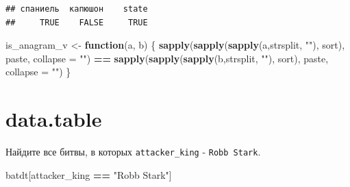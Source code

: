 \documentclass[]{book}
\newenvironment{Shaded}{\begin{snugshade}}{\end{snugshade}}
\newcommand{\KeywordTok}[1]{\textcolor[rgb]{0.13,0.29,0.53}{\textbf{#1}}}
\newcommand{\DataTypeTok}[1]{\textcolor[rgb]{0.13,0.29,0.53}{#1}}
\newcommand{\StringTok}[1]{\textcolor[rgb]{0.31,0.60,0.02}{#1}}
\newcommand{\ControlFlowTok}[1]{\textcolor[rgb]{0.13,0.29,0.53}{\textbf{#1}}}
\newcommand{\OperatorTok}[1]{\textcolor[rgb]{0.81,0.36,0.00}{\textbf{#1}}}
\newcommand{\NormalTok}[1]{#1}
\begin{document}
\begin{verbatim}
## спаниель  капюшон    state 
##     TRUE    FALSE     TRUE
\end{verbatim}

\begin{Shaded}
\begin{Highlighting}[]
\NormalTok{is_anagram_v <-}\StringTok{ }\ControlFlowTok{function}\NormalTok{(a, b) \{}
  \KeywordTok{sapply}\NormalTok{(}\KeywordTok{sapply}\NormalTok{(}\KeywordTok{sapply}\NormalTok{(a,strsplit, }\StringTok{""}\NormalTok{), sort), paste, }\DataTypeTok{collapse =} \StringTok{""}\NormalTok{) }\OperatorTok{==}\StringTok{ }\KeywordTok{sapply}\NormalTok{(}\KeywordTok{sapply}\NormalTok{(}\KeywordTok{sapply}\NormalTok{(b,strsplit, }\StringTok{""}\NormalTok{), sort), paste, }\DataTypeTok{collapse =} \StringTok{""}\NormalTok{)}
\NormalTok{\}}
\end{Highlighting}
\end{Shaded}

\section{data.table}\label{solvdt_task}

Найдите все битвы, в которых \texttt{attacker\_king} -
\texttt{Robb\ Stark}.

\begin{Shaded}
\begin{Highlighting}[]
\NormalTok{batdt[attacker_king }\OperatorTok{==}\StringTok{ "Robb Stark"}\NormalTok{]}
\end{Highlighting}
\end{Shaded}
\end{document}
